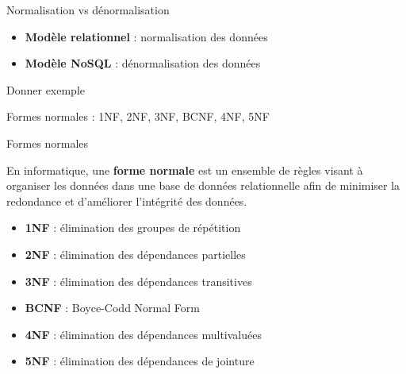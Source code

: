 \begin{frame}{Normalisation vs dénormalisation}

    \begin{itemize}
        \item \textbf{Modèle relationnel} : normalisation des données
        \item \textbf{Modèle NoSQL} : dénormalisation des données
    \end{itemize}

    Donner exemple

    Formes normales : 1NF, 2NF, 3NF, BCNF, 4NF, 5NF
\end{frame}

\begin{frame}{Formes normales}

    En informatique, une \textbf{forme normale} est un ensemble de règles visant à organiser les données dans une base de données relationnelle afin de minimiser la redondance et d'améliorer l'intégrité des données.
    \begin{itemize}
        \item \textbf{1NF} : élimination des groupes de répétition
        \item \textbf{2NF} : élimination des dépendances partielles
        \item \textbf{3NF} : élimination des dépendances transitives
        \item \textbf{BCNF} : Boyce-Codd Normal Form
        \item \textbf{4NF} : élimination des dépendances multivaluées
        \item \textbf{5NF} : élimination des dépendances de jointure
    \end{itemize}

\end{frame}

